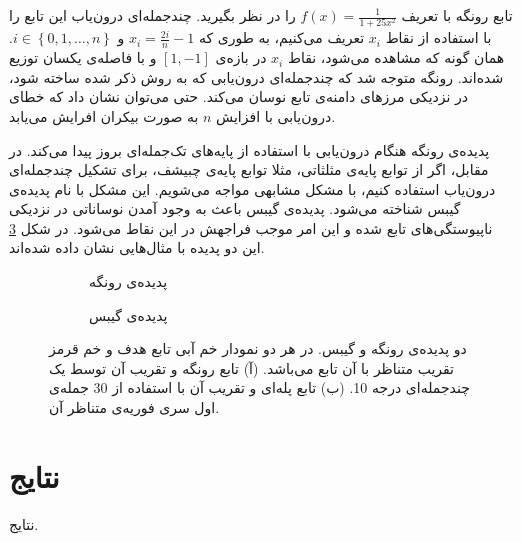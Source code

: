 \documentclass[12pt,onecolumn,a4paper]{article}
\begin{document}
تابع رونگه با تعریف 
$f(x)=\frac{1}{1+25x^2}$ 
را در نظر بگیرید. چندجمله‌ای درون‌یاب این تابع را با استفاده از نقاط 
$x_i$ 
تعریف می‌کنیم، به طوری که
$x_{i}=\frac{2i}{n}-1$ 
و 
$i\in \left\{0,1,\dots ,n\right\}$.
همان گونه که مشاهده می‌شود، نقاط 
$x_i$ 
در بازه‌ی 
$[1,-1]$ 
و با فاصله‌ی یکسان توزیع شده‌اند. رونگه متوجه شد که چندجمله‌ای درون‌یابی که به روش ذکر شده ساخته شود، در نزدیکی مرز‌های دامنه‌ی تابع نوسان می‌کند. حتی می‌توان نشان داد که خطای درون‌یابی با افزایش 
$n$ 
 به صورت بیکران افرایش می‌یابد.

پدیده‌ی رونگه هنگام درون‌یابی با استفاده از پایه‌های تک‌جمله‌ای
بروز پیدا می‌کند. در مقابل، اگر از توابع پایه‌ی مثلثاتی، مثلا توابع پایه‌ی چبیشف، برای تشکیل چندجمله‌ای درون‌یاب استفاده کنیم، با مشکل مشابهی مواجه می‌شویم. این مشکل  با نام پدیده‌ی گیبس
شناخته می‌شود. پدیده‌ی گیبس باعث به وجود آمدن نوساناتی در نزدیکی ناپیوستگی‌های تابع شده و این امر موجب فراجهش
در این نقاط می‌شود. در شکل 
\ref{fig:runge_gibbs} 
این دو پدیده با مثال‌هایی نشان داده‌ شده‌اند.

 \begin{figure}
    \centering
    \begin{subfigure}[b]{0.45\textwidth}
        \centering
        \caption{پدیده‌ی رونگه}
        \label{fig:runge}
    \end{subfigure}
    \hfill
    \begin{subfigure}[b]{0.45\textwidth}
        \centering
        \caption{پدیده‌ی گیبس}
        \label{fig:gibbs}
    \end{subfigure}
       \caption{دو پدیده‌ی رونگه و گیبس. در هر دو نمودار خم آبی تابع هدف و خم قرمز تقریب متناظر با آن تابع می‌باشد. (آ) تابع رونگه و تقریب آن توسط یک چندجمله‌ای درجه 10. (ب) تابع پله‌ای و تقریب آن با استفاده از 30 جمله‌ی اول سری فوریه‌ی متناظر آن.}
       \label{fig:runge_gibbs}
\end{figure}



\section{نتایج}
نتایج.
\end{document}
